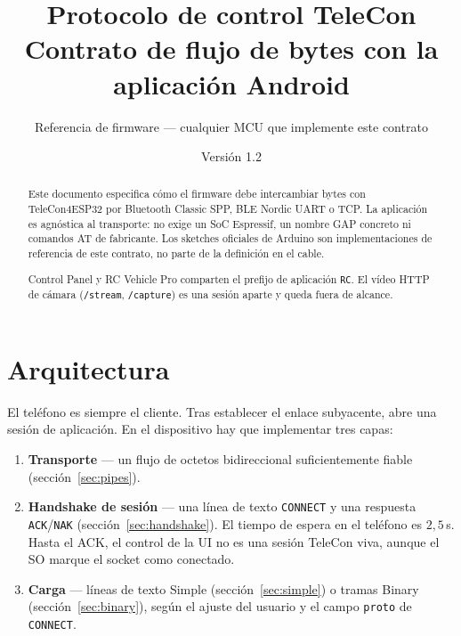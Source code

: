 \documentclass[12pt,a4paper]{article}
\title{Protocolo de control TeleCon\\[0.4em]
\large Contrato de flujo de bytes con la aplicación Android}
\author{Referencia de firmware --- cualquier MCU que implemente este contrato}
\date{Versión 1.2 \quad 2026}
\begin{document}
\maketitle

\begin{abstract}
Este documento especifica cómo el firmware debe intercambiar bytes con
TeleCon4ESP32 por Bluetooth Classic SPP, BLE Nordic UART o TCP.
La aplicación es agnóstica al transporte: no exige un SoC Espressif, un
nombre GAP concreto ni comandos AT de fabricante.
Los sketches oficiales de Arduino son implementaciones de referencia de
este contrato, no parte de la definición en el cable.

Control Panel y RC Vehicle Pro comparten el prefijo de aplicación \texttt{RC}.
El vídeo HTTP de cámara (\texttt{/stream}, \texttt{/capture}) es una sesión
aparte y queda fuera de alcance.
\end{abstract}

\section{Arquitectura}
\label{sec:arch}

El teléfono es siempre el cliente. Tras establecer el enlace subyacente,
abre una sesión de aplicación. En el dispositivo hay que implementar tres
capas:

\begin{enumerate}[leftmargin=1.6cm]
  \item \textbf{Transporte} --- un flujo de octetos bidireccional
        suficientemente fiable (sección~\ref{sec:pipes}).
  \item \textbf{Handshake de sesión} --- una línea de texto \texttt{CONNECT}
        y una respuesta \texttt{ACK}/\texttt{NAK} (sección~\ref{sec:handshake}).
        El tiempo de espera en el teléfono es $2{,}5$\,s. Hasta el ACK, el
        control de la UI no es una sesión TeleCon viva, aunque el SO marque
        el socket como conectado.
  \item \textbf{Carga} --- líneas de texto Simple (sección~\ref{sec:simple})
        o tramas Binary (sección~\ref{sec:binary}), según el ajuste del
        usuario y el campo \texttt{proto} de \texttt{CONNECT}.
\end{enumerate}
\end{document}
